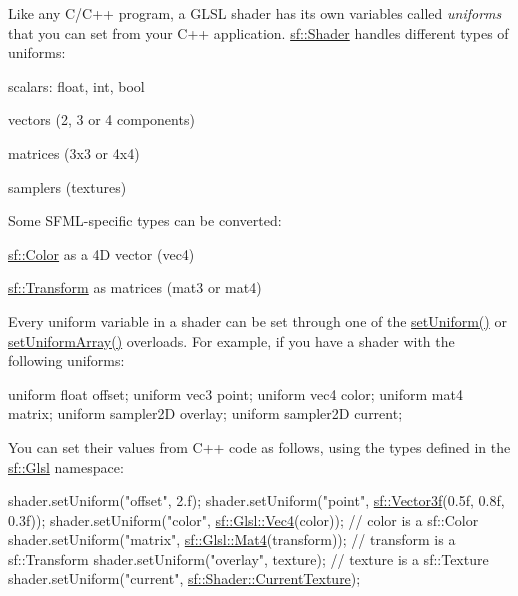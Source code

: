 Like any C/\+C++ program, a G\+L\+SL shader has its own variables called {\itshape uniforms} that you can set from your C++ application. \hyperlink{classsf_1_1_shader}{sf\+::\+Shader} handles different types of uniforms\+: \begin{DoxyItemize}
\item scalars\+: {\ttfamily float}, {\ttfamily int}, {\ttfamily bool} \item vectors (2, 3 or 4 components) \item matrices (3x3 or 4x4) \item samplers (textures)\end{DoxyItemize}
Some S\+F\+M\+L-\/specific types can be converted\+: \begin{DoxyItemize}
\item \hyperlink{classsf_1_1_color}{sf\+::\+Color} as a 4D vector ({\ttfamily vec4}) \item \hyperlink{classsf_1_1_transform}{sf\+::\+Transform} as matrices ({\ttfamily mat3} or {\ttfamily mat4})\end{DoxyItemize}
Every uniform variable in a shader can be set through one of the \hyperlink{classsf_1_1_shader_abf78e3bea1e9b0bab850b6b0a0de29c7}{set\+Uniform()} or \hyperlink{classsf_1_1_shader_a731d3b9953c50fe7d3fb03340b97deff}{set\+Uniform\+Array()} overloads. For example, if you have a shader with the following uniforms\+: 
\begin{DoxyCode}
uniform \textcolor{keywordtype}{float} offset;
uniform vec3 point;
uniform vec4 color;
uniform mat4 matrix;
uniform sampler2D overlay;
uniform sampler2D current;
\end{DoxyCode}
 You can set their values from C++ code as follows, using the types defined in the \hyperlink{namespacesf_1_1_glsl}{sf\+::\+Glsl} namespace\+: 
\begin{DoxyCode}
shader.setUniform(\textcolor{stringliteral}{"offset"}, 2.f);
shader.setUniform(\textcolor{stringliteral}{"point"}, \hyperlink{classsf_1_1_vector3}{sf::Vector3f}(0.5f, 0.8f, 0.3f));
shader.setUniform(\textcolor{stringliteral}{"color"}, \hyperlink{structsf_1_1priv_1_1_vector4}{sf::Glsl::Vec4}(color));          \textcolor{comment}{// color is a sf::Color}
shader.setUniform(\textcolor{stringliteral}{"matrix"}, \hyperlink{structsf_1_1priv_1_1_matrix}{sf::Glsl::Mat4}(transform));     \textcolor{comment}{// transform is a sf::Transform}
shader.setUniform(\textcolor{stringliteral}{"overlay"}, texture);                      \textcolor{comment}{// texture is a sf::Texture}
shader.setUniform(\textcolor{stringliteral}{"current"}, \hyperlink{classsf_1_1_shader_ac84c7953eec2e19358ea6e2cc5385b8d}{sf::Shader::CurrentTexture});
\end{DoxyCode}


